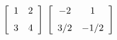 {$\left[ \begin {array}{cc} 1&2\\\noalign{\medskip}3&4\end {array}
 \right] $
 }
{$\left[ \begin {array}{cc} -2&1\\\noalign{\medskip}3/2&-1/2\end {array}
 \right] $}
